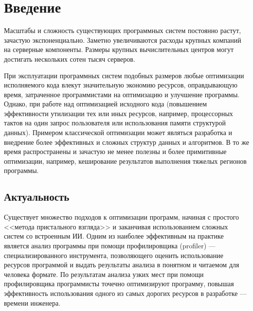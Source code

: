 \section{Введение}

\epigraph{
}{
}

Масштабы и сложность существующих программных систем постоянно растут, зачастую экспоненциально.
Заметно увеличиваются расходы крупных компаний на серверные компоненты.
Размеры крупных вычислительных центров могут достигать нескольких сотен тысяч серверов.

При эксплуатации программных систем подобных размеров любые оптимизации исполняемого кода влекут значительную экономию ресурсов, оправдывающую время, затраченное программистами на оптимизацию и улучшение программы.
Однако, при работе над оптимизацией исходного кода (повышением эффективности утилизации тех или иных ресурсов, например, процессорных тактов на один запрос пользователя или использования памяти структурой данных).
Примером классической оптимизации может являться разработка и внедрение более эффективных и сложных структур данных и алгоритмов.
В то же время распространены и зачастую не менее полезны и более примитивные оптимизации, например, кеширование результатов выполнения тяжелых регионов программы.

\subsection{Актуальность}
Существует множество подходов к оптимизации программ, начиная с простого <<метода пристального взгляда>> и заканчивая использованием сложных систем со встроенным ИИ.
Одним из наиболее эффективным на практике является анализ программы при помощи профилировщика (profiler) --- специализированного инструмента, позволяющего оценить использование ресурсов программой и выдать результаты анализа в понятном и читаемом для человека формате. По результатам анализа узких мест при помощи профилировщика программисты точечно оптимизируют программу, повышая эффективность использования одного из самых дорогих ресурсов в разработке --- времени инженера.

